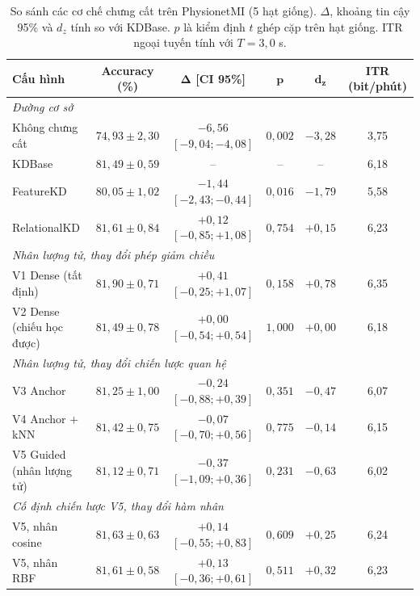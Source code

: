 \begin{table}[!htbp]
\centering
\caption{So sánh các cơ chế chưng cất trên PhysionetMI (5 hạt giống).
$\Delta$, khoảng tin cậy 95\% và $d_z$ tính so với KDBase. $p$ là kiểm
định $t$ ghép cặp trên hạt giống. ITR ngoại tuyến tính với $T = 3{,}0$ s.}
\label{tab:tongthe}
\footnotesize
\setlength{\tabcolsep}{4pt}
\begin{tabular}{lccccc}
\toprule
\textbf{Cấu hình} & \textbf{Accuracy (\%)} & $\boldsymbol{\Delta}$ \textbf{[CI 95\%]} & $\boldsymbol{p}$ & $\boldsymbol{d_z}$ & \textbf{ITR (bit/phút)} \\
\midrule
\multicolumn{6}{l}{\textit{Đường cơ sở}} \\
Không chưng cất & $74{,}93 \pm 2{,}30$ & $-6{,}56$ $[-9{,}04; -4{,}08]$ & $0{,}002$ & $-3{,}28$ & 3,75 \\
KDBase & $81{,}49 \pm 0{,}59$ & -- & -- & -- & 6,18 \\
FeatureKD & $80{,}05 \pm 1{,}02$ & $-1{,}44$ $[-2{,}43; -0{,}44]$ & $0{,}016$ & $-1{,}79$ & 5,58 \\
RelationalKD & $81{,}61 \pm 0{,}84$ & $+0{,}12$ $[-0{,}85; +1{,}08]$ & $0{,}754$ & $+0{,}15$ & 6,23 \\
\midrule
\multicolumn{6}{l}{\textit{Nhân lượng tử, thay đổi phép giảm chiều}} \\
V1 Dense (tất định) & $81{,}90 \pm 0{,}71$ & $+0{,}41$ $[-0{,}25; +1{,}07]$ & $0{,}158$ & $+0{,}78$ & 6,35 \\
V2 Dense (chiếu học được) & $81{,}49 \pm 0{,}78$ & $+0{,}00$ $[-0{,}54; +0{,}54]$ & $1{,}000$ & $+0{,}00$ & 6,18 \\
\midrule
\multicolumn{6}{l}{\textit{Nhân lượng tử, thay đổi chiến lược quan hệ}} \\
V3 Anchor & $81{,}25 \pm 1{,}00$ & $-0{,}24$ $[-0{,}88; +0{,}39]$ & $0{,}351$ & $-0{,}47$ & 6,07 \\
V4 Anchor $+$ kNN & $81{,}42 \pm 0{,}75$ & $-0{,}07$ $[-0{,}70; +0{,}56]$ & $0{,}775$ & $-0{,}14$ & 6,15 \\
V5 Guided (nhân lượng tử) & $81{,}12 \pm 0{,}71$ & $-0{,}37$ $[-1{,}09; +0{,}36]$ & $0{,}231$ & $-0{,}63$ & 6,02 \\
\midrule
\multicolumn{6}{l}{\textit{Cố định chiến lược V5, thay đổi hàm nhân}} \\
V5, nhân cosine & $81{,}63 \pm 0{,}63$ & $+0{,}14$ $[-0{,}55; +0{,}83]$ & $0{,}609$ & $+0{,}25$ & 6,24 \\
V5, nhân RBF & $81{,}61 \pm 0{,}58$ & $+0{,}13$ $[-0{,}36; +0{,}61]$ & $0{,}511$ & $+0{,}32$ & 6,23 \\
\bottomrule
\end{tabular}
\end{table}
\FloatBarrier

